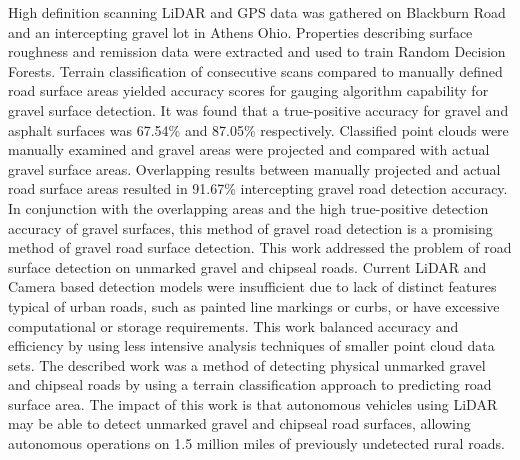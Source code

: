 \documentclass[balance,upint,subscriptcorrection,varvw,mathalfa=cal=boondoxo,colorlinks]{asmeconf}
\begin{document}
	{High definition scanning LiDAR and GPS data was gathered on Blackburn Road and an intercepting gravel lot in Athens Ohio. Properties describing surface roughness and remission data were extracted and used to train Random Decision Forests. Terrain classification of consecutive scans compared to manually defined road surface areas yielded accuracy scores for gauging algorithm capability for gravel surface detection. It was found that a true-positive accuracy for gravel and asphalt surfaces was 67.54\% and 87.05\% respectively. Classified point clouds were manually examined and gravel areas were projected and compared with actual gravel surface areas. Overlapping results between manually projected and actual road surface areas resulted in 91.67\% intercepting gravel road detection accuracy. In conjunction with the overlapping areas and the high true-positive detection accuracy of gravel surfaces, this method of gravel road detection is a promising method of gravel road surface detection. This work addressed the problem of road surface detection on unmarked gravel and chipseal roads. Current LiDAR and Camera based detection models were insufficient due to lack of distinct features typical of urban roads, such as painted line markings or curbs, or have excessive computational or storage requirements. This work balanced accuracy and efficiency by using less intensive analysis techniques of smaller point cloud data sets. The described work was a method of detecting physical unmarked gravel and chipseal roads by using a terrain classification approach to predicting road surface area. The impact of this work is that autonomous vehicles using LiDAR may be able to detect unmarked gravel and chipseal road surfaces, allowing autonomous operations on 1.5 million miles of previously undetected rural roads.} 






 



\appendix
\end{document}
